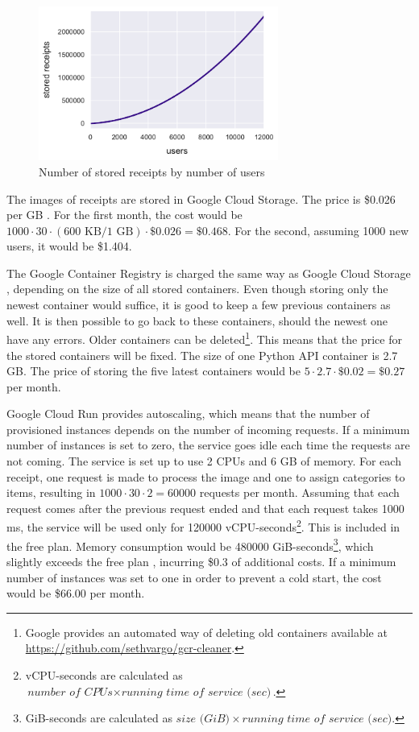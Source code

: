 \documentclass[
  digital, %
  table,   %
  oneside, %
  lof,     %
  lot,     %
]{fithesis3}
\begin{document}
\begin{figure}
    \begin{center}
        \includegraphics[width=0.7\textwidth]{figures/graphs/receipts_by_users}
    \end{center}
    \caption{Number of stored receipts by number of users}
    \label{fig:receipts_by_users}
\end{figure}

The images of receipts are stored in Google Cloud Storage. The price is \$0.026 per GB \cite{CloudStoragePricing}. For the first month, the cost would be $\num{1000} \cdot 30 \cdot (600\text{ KB} / 1\text{ GB}) \cdot \$0.026 = \$0.468$.
For the second, assuming \num{1000} new users, it would be \$1.404.

The Google Container Registry is charged the same way as Google Cloud Storage \cite{ContainerRegistryPricing}, depending on the size of all stored containers. Even though storing only the newest container would suffice, it is good to keep a few previous containers as well. It is then possible to go back to these containers, should the newest one have any errors. Older containers can be deleted\footnote{Google provides an automated way of deleting old containers available at \url{https://github.com/sethvargo/gcr-cleaner}.}. This means that the price for the stored containers will be fixed. The size of one Python API container is 2.7 GB. The price of storing the five latest containers would be $5 \cdot 2.7 \cdot \$0.02 = \$0.27$ per month. 

Google Cloud Run provides autoscaling, which means that the number of provisioned instances depends on the number of incoming requests. If a minimum number of instances is set to zero, the service goes idle each time the requests are not coming. The service is set up to use 2 CPUs and 6 GB of memory. For each receipt, one request is made to process the image and one to assign categories to items, resulting in $\num{1000} \cdot 30 \cdot 2 = \num{60000}$ requests per month. Assuming that each request comes after the previous request ended and that each request takes \num{1000} ms, the service will be used only for \num{120000} vCPU-seconds\footnote{vCPU-seconds are calculated as $\textit{number of CPUs} \times \textit{running time of service (sec)}$.}. This is included in the free plan. Memory consumption would be \num{480000} GiB-seconds\footnote{GiB-seconds are calculated as $\textit{size (GiB)} \times \textit{running time of service (sec)}.$}, which slightly exceeds the free plan \cite{CloudRunPricing}, incurring \$0.3 of additional costs. 
If a minimum number of instances was set to one in order to prevent a cold start, the cost would be \$66.00 per month.
\end{document}
